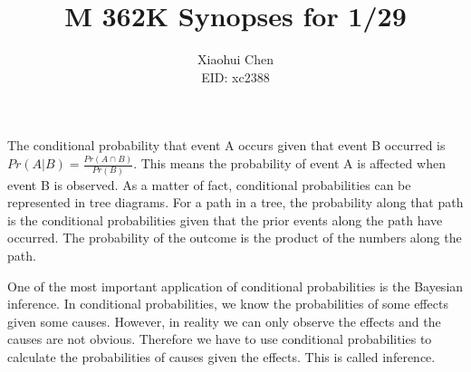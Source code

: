 \documentclass[12pt]{article}
\author{Xiaohui Chen \\EID: xc2388}
\title{M 362K Synopses for 1/29}
\begin{document}
\maketitle
\begin{spacing}{2.0}

The conditional probability that event A occurs given that event B occurred is $Pr(A|B)=\frac{Pr(A\cap B)}{Pr(B)}$. This means the probability of event A is affected when event B is observed. As a matter of fact, conditional probabilities can be represented in tree diagrams. For a path in a tree, the probability along that path is the conditional probabilities given that the prior events along the path have occurred. The probability of the outcome is the product of the numbers along the path.

One of the most important application of conditional probabilities is the Bayesian inference. In conditional probabilities, we know the probabilities of some effects given some causes. However, in reality we can only observe the effects and the causes are not obvious. Therefore we have to use conditional probabilities to calculate the probabilities of causes given the effects. This is called inference.

\end{spacing}
\end{document}
